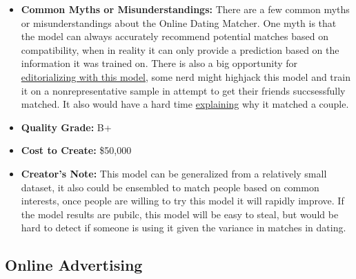 \begin{itemize}
\begin{itemize}
    \item \textbf{Common Myths or Misunderstandings:} There are a few common myths or misunderstandings about the Online Dating Matcher. One myth is that the model can always accurately recommend potential matches based on compatibility, when in reality it can only provide a prediction based on the information it was trained on. There is also a big opportunity for \hyperref[sec:janitor]{editorializing with this model}, some nerd might highjack this model and train it on a nonrepresentative sample in attempt to get their friends succsessfully matched. It also would have a hard time \hyperref[sec:explain]{explaining} why it matched a couple.
    \item \textbf{Quality Grade:} B+
    \item \textbf{Cost to Create:} \$50,000
    \item \textbf{Creator's Note:} This model can be generalized from a relatively small dataset, it also could be ensembled to match people based on common interests, once people are willing to try this model it will rapidly improve. If the model results are pubilc, this model will be easy to steal, but would be hard to detect if someone is using it given the variance in matches in dating.
\end{itemize}

\subsection{Online Advertising}


\end{itemize}
